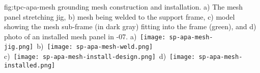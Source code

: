 \begin{dunefigure}{fig:tpc-apa-mesh}
{ grounding mesh construction and installation. a) The mesh panel stretching jig, b) mesh being welded to the support frame, c) model showing the mesh sub-frame (in dark gray) fitting into the  frame (green), and d) photo of an installed mesh panel in -07.}
\mbox{a) \texttt{[image: sp-apa-mesh-jig.png]} \hspace{0.0mm}
b) \texttt{[image: sp-apa-mesh-weld.png]}} \\
\vspace{3mm}
\hspace{0.4mm}
\mbox{c) \texttt{[image: sp-apa-mesh-install-design.png]}
d) \texttt{[image: sp-apa-mesh-installed.png]}}
\end{dunefigure}

\begin{comment}
\begin{dunefigure}[Photos of APA grounding mesh application in ProtoDUNE-SP]{fig:tpc-apa-mesh-application}
{Grounding mesh being clamped to the \dword{apa} and taped off, ready for gluing to a \dword{pdsp} frame.}
\texttt{[image: sp-apa-mesh-application.png]} \quad
\texttt{[image: sp-apa-mesh-applied.jpg]}
\end{dunefigure}
\end{comment}


